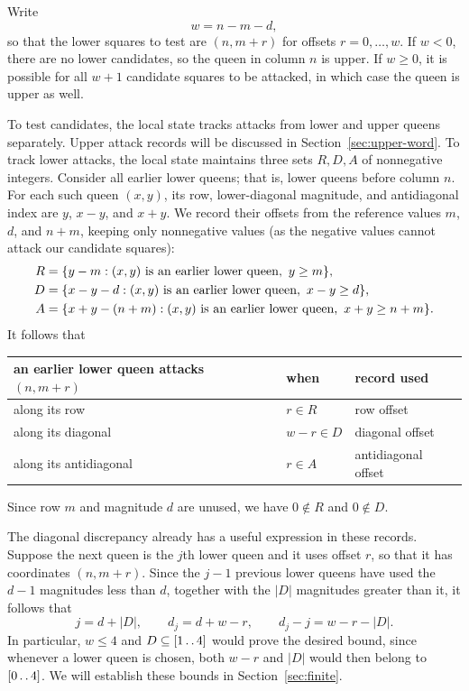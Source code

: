 Write
\begin{equation}\label{eq:window}
 w=n-m-d,
\end{equation}
so that the lower squares to test are $(n,m+r)$ for offsets $r=0,\dots,w$.
If $w<0$, there are no lower candidates, so the queen in column $n$
is upper. If $w\ge0$, it is possible for all $w+1$ candidate squares
to be attacked, in which case the queen is upper as well.

To test candidates, the local state tracks attacks from lower and upper
queens separately. Upper attack records will be discussed in Section~\ref{sec:upper-word}.
To track lower attacks, the local state maintains three sets $R,D,A$ of
nonnegative integers. Consider all earlier lower queens; that is, lower
queens before column $n$. For each such queen $(x,y)$, its row,
lower-diagonal magnitude, and antidiagonal index are $y$, $x-y$,
and $x+y$. We record their offsets from the reference values $m$,
$d$, and $n+m$, keeping only nonnegative values (as the negative values cannot attack our candidate squares):
\begin{align}
 R&=\{y-m:(x,y)\text{ is an earlier lower queen},\ y\ge m\},\notag\\
 D&=\{x-y-d:(x,y)\text{ is an earlier lower queen},\ x-y\ge d\},
       \label{eq:sets}\\
 A&=\{x+y-(n+m):(x,y)\text{ is an earlier lower queen},\ x+y\ge n+m\}.
       \notag
\end{align}
It follows that
\begin{center}
\begin{tabular}{lll}
\toprule
an earlier lower queen attacks $(n,m+r)$&when&record used\\
\midrule
along its row&$r\in R$&row offset\\
along its diagonal&$w-r\in D$&diagonal offset\\
along its antidiagonal&$r\in A$&antidiagonal offset\\
\bottomrule
\end{tabular}
\end{center}
Since row $m$ and magnitude $d$ are unused, we have
$0\notin R$ and $0\notin D$.

The diagonal discrepancy already has a useful expression in these
records. Suppose the next queen is the $j$th lower queen and it uses
offset $r$, so that it has coordinates $(n,m+r)$. 
Since the $j-1$ previous lower queens have used the $d-1$
magnitudes less than $d$, together with the $|D|$ magnitudes greater than it, it follows that
\begin{equation}\label{eq:local-rank}
 j=d+|D|,\qquad d_j=d+w-r,\qquad
 d_j-j=w-r-|D|.
\end{equation}
In particular, $w\le4$ and $D\subseteq[1\mathinner{\ldotp\ldotp}4]$ would prove the
desired bound, since whenever a lower queen is chosen, 
both $w-r$ and $|D|$ would then belong to $[0\mathinner{\ldotp\ldotp}4]$. 
We will establish these bounds in Section~\ref{sec:finite}.




